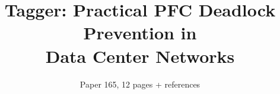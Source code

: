 \documentclass[letterpaper,twocolumn,fleqn]{sig-alternate-10pt}
\newcommand{\sysname}{Tagger}
\begin{document}
\title{\sysname{}: Practical PFC Deadlock Prevention in\\Data Center Networks}
\author{Paper 165, 12 pages + references}
\maketitle
















\end{document}
